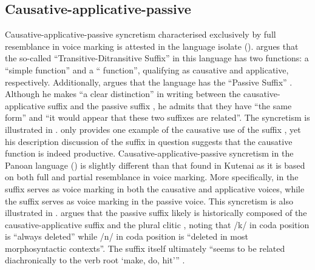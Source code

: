 \subsection{Causative-applicative-passive} \label{sec:complex-syncretism:caus-appl-pass}
Causative-applicative-passive syncretism characterised exclusively by full resemblance in voice marking is attested in the language isolate  (). \citet[300]{morgan:1991} argues that the so-called “Transitive-Ditransitive Suffix”  in this language has two functions: a “simple  function” and a “ function”, qualifying as causative and applicative, respectively. Additionally, \citet[301]{morgan:1991} argues that the language has the “Passive Suffix” . Although he makes “a clear distinction” in writing between the causative-appli\-ca\-tive suffix  and the passive suffix , he admits that they have “the same form” and “it would appear that these two suffixes are related”. The syncretism is illustrated in . \citeauthor{morgan:1991} only provides one example of the causative use of the suffix , yet his description discussion of the suffix in question suggests that the causative function is indeed productive. Causative-applicative-passive syncretism in the Panoan language  () is slightly different than that found in Kutenai as it is based on both full and partial resemblance in voice marking. More specifically, in  the suffix  serves as voice marking in both the causative and applicative voices, while the suffix  serves as voice marking in the passive voice. This syncretism is also illustrated in . \citet[644]{tallman:2018} argues that the passive suffix likely is historically composed of the causative-applicative suffix  and the plural clitic , noting that /k/ in coda position is “always deleted” while /n/ in coda position is “deleted in most morphosyntactic contexts”. The suffix  itself ultimately “seems to be related diachronically to the  verb root  ‘make, do, hit’” \citep[652]{tallman:2018}.

